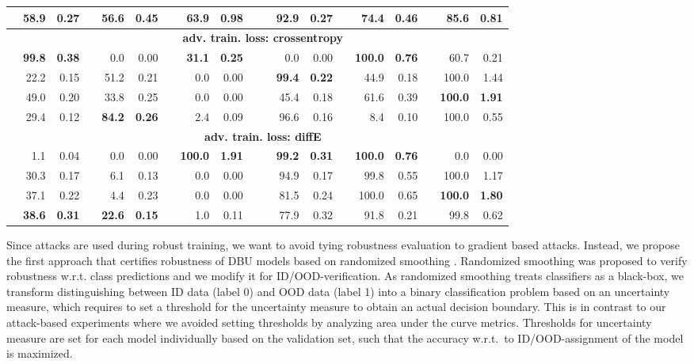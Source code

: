 \begin{table*}[ht!]
\begin{tiny}
\begin{tabular}{@{}rrrcrrcrrc|crrcrrcrr@{}}
			\EvNet  & 58.9 & 0.27 & & 56.6 & 0.45 & & 63.9 & 0.98  & 
			& & 92.9 & 0.27 & & 74.4 & 0.46 & & \bf{85.6} & \bf{0.81} \\ 
			\midrule
			& \multicolumn{18}{c}{\textbf{adv. train. loss: crossentropy}} \\ 
			\PriorNet  & \bf{99.8} & \bf{0.38} & & 0.0 & 0.00 & & \bf{31.1} & \bf{0.25}  & 
			& & 0.0 & 0.00 & & \bf{100.0} & \bf{0.76} & & 60.7 & 0.21 \\ 
			\PostNet  & 22.2 & 0.15 & & 51.2 & 0.21 & & 0.0 & 0.00  & 
			& & \bf{99.4} & \bf{0.22} & & 44.9 & 0.18 & & 100.0 & 1.44 \\ 
			\DDNet  & 49.0 & 0.20 & & 33.8 & 0.25 & & 0.0 & 0.00  & 
			& & 45.4 & 0.18 & & 61.6 & 0.39 & & \bf{100.0} & \bf{1.91} \\ 
			\EvNet  & 29.4 & 0.12 & & \bf{84.2} & \bf{0.26} & & 2.4 & 0.09  & 
			& & 96.6 & 0.16 & & 8.4 & 0.10 & & 100.0 & 0.55 \\ 
			\midrule 
			& \multicolumn{18}{c}{\textbf{adv. train. loss: diffE}} \\ 
			\PriorNet  & 1.1 & 0.04 & & 0.0 & 0.00 & & \bf{100.0} & \bf{1.91}  & 
			& & \bf{99.2} & \bf{0.31} & & \bf{100.0} & \bf{0.76} & & 0.0 & 0.00 \\ 
			\PostNet  & 30.3 & 0.17 & & 6.1 & 0.13 & & 0.0 & 0.00  & 
			& & 94.9 & 0.17 & & 99.8 & 0.55 & & 100.0 & 1.17 \\ 
			\DDNet  & 37.1 & 0.22 & & 4.4 & 0.23 & & 0.0 & 0.00  & 
			& & 81.5 & 0.24 & & 100.0 & 0.65 & & \bf{100.0} & \bf{1.80} \\ 
			\EvNet  & \bf{38.6} & \bf{0.31} & & \bf{22.6} & \bf{0.15} & & 1.0 & 0.11  & 
			& & 77.9 & 0.32 & & 91.8 & 0.21 & & 99.8 & 0.62 \\ 
			\bottomrule
		\end{tabular}
	\end{tiny}
	\label{tab:rand_smoothing_ioood_cifar10}
\end{table*}


Since attacks are used during robust training, we want to avoid tying robustness evaluation to gradient based attacks. Instead, we propose {the first approach that certifies robustness of DBU models} based on randomized smoothing \citep{cohen2019}.
Randomized smoothing was proposed to verify robustness w.r.t. class predictions and we modify it for ID/OOD-verification. As randomized smoothing treats classifiers as a black-box, we transform distinguishing between ID data (label 0) and OOD data (label 1) into a binary classification problem based on an uncertainty measure, which requires to set a threshold for the uncertainty measure to obtain an actual decision boundary. This is in contrast to our attack-based experiments where we avoided setting thresholds by analyzing area under the curve metrics. Thresholds for uncertainty measure are set for each model individually based on the validation set, such that the accuracy w.r.t.\ to ID/OOD-assignment of the model is maximized. 


